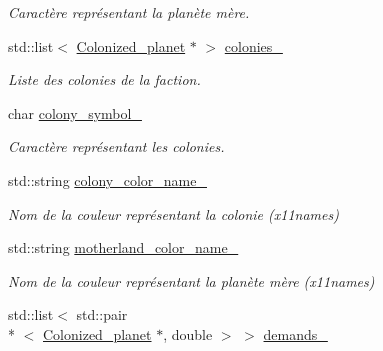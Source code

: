 \begin{DoxyCompactItemize}
\begin{DoxyCompactList}\small\item\em Caractère représentant la planète mère. \end{DoxyCompactList}\item 
\hypertarget{classFaction_af79e92739f25528585a539cefd719169}{std\-::list$<$ \hyperlink{classColonized__planet}{Colonized\-\_\-planet} $\ast$ $>$ \hyperlink{classFaction_af79e92739f25528585a539cefd719169}{colonies\-\_\-}}\label{classFaction_af79e92739f25528585a539cefd719169}

\begin{DoxyCompactList}\small\item\em Liste des colonies de la faction. \end{DoxyCompactList}\item 
\hypertarget{classFaction_a3c87e113f23c7638ec3ae447076f9f4a}{char \hyperlink{classFaction_a3c87e113f23c7638ec3ae447076f9f4a}{colony\-\_\-symbol\-\_\-}}\label{classFaction_a3c87e113f23c7638ec3ae447076f9f4a}

\begin{DoxyCompactList}\small\item\em Caractère représentant les colonies. \end{DoxyCompactList}\item 
\hypertarget{classFaction_aff4c256d6a30079ab09d5a9507003440}{std\-::string \hyperlink{classFaction_aff4c256d6a30079ab09d5a9507003440}{colony\-\_\-color\-\_\-name\-\_\-}}\label{classFaction_aff4c256d6a30079ab09d5a9507003440}

\begin{DoxyCompactList}\small\item\em Nom de la couleur représentant la colonie (x11names) \end{DoxyCompactList}\item 
\hypertarget{classFaction_ac67cd3b073d08e8dc3ac91a52a9daac0}{std\-::string \hyperlink{classFaction_ac67cd3b073d08e8dc3ac91a52a9daac0}{motherland\-\_\-color\-\_\-name\-\_\-}}\label{classFaction_ac67cd3b073d08e8dc3ac91a52a9daac0}

\begin{DoxyCompactList}\small\item\em Nom de la couleur représentant la planète mère (x11names) \end{DoxyCompactList}\item 
\hypertarget{classFaction_a6b7e2884e11b6c194e3399a318fda710}{std\-::list$<$ std\-::pair\\*
$<$ \hyperlink{classColonized__planet}{Colonized\-\_\-planet} $\ast$, double $>$ $>$ \hyperlink{classFaction_a6b7e2884e11b6c194e3399a318fda710}{demands\-\_\-}}\label{classFaction_a6b7e2884e11b6c194e3399a318fda710}


\end{DoxyCompactItemize}
